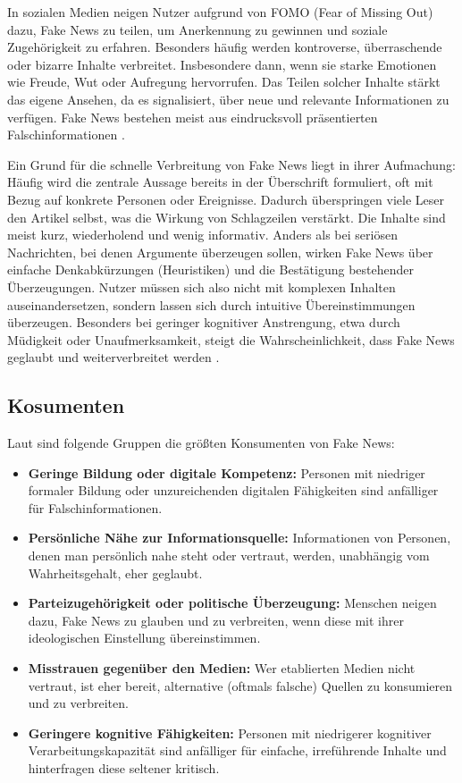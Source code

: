 In sozialen Medien neigen Nutzer aufgrund von FOMO (Fear of Missing Out) dazu, Fake News zu teilen, um Anerkennung zu gewinnen und soziale Zugehörigkeit zu erfahren. 
Besonders häufig werden kontroverse, überraschende oder bizarre Inhalte verbreitet. Insbesondere dann, wenn sie starke Emotionen wie Freude, Wut oder Aufregung hervorrufen. 
Das Teilen solcher Inhalte stärkt das eigene Ansehen, da es signalisiert, über neue und relevante Informationen zu verfügen. 
Fake News bestehen meist aus eindrucksvoll präsentierten Falschinformationen \cite{socsci9100185}.

Ein Grund für die schnelle Verbreitung von Fake News liegt in ihrer Aufmachung: Häufig wird die zentrale Aussage bereits in der Überschrift formuliert, 
oft mit Bezug auf konkrete Personen oder Ereignisse. Dadurch überspringen viele Leser den Artikel selbst, was die Wirkung von Schlagzeilen verstärkt. 
Die Inhalte sind meist kurz, wiederholend und wenig informativ. Anders als bei seriösen Nachrichten, bei denen Argumente überzeugen sollen, wirken Fake News über einfache Denkabkürzungen (Heuristiken) und die Bestätigung bestehender Überzeugungen. 
Nutzer müssen sich also nicht mit komplexen Inhalten auseinandersetzen, sondern lassen sich durch intuitive Übereinstimmungen überzeugen. 
Besonders bei geringer kognitiver Anstrengung, etwa durch Müdigkeit oder Unaufmerksamkeit, steigt die Wahrscheinlichkeit, dass Fake News geglaubt und weiterverbreitet werden \cite{horne2017}.

\subsection{Kosumenten}

Laut \cite{horne2017} sind folgende Gruppen die größten Konsumenten von Fake News:

\begin{itemize}
    \item \textbf{Geringe Bildung oder digitale Kompetenz:} Personen mit niedriger formaler Bildung oder unzureichenden digitalen Fähigkeiten sind anfälliger für Falschinformationen.
    
    \item \textbf{Persönliche Nähe zur Informationsquelle:} Informationen von Personen, denen man persönlich nahe steht oder vertraut, werden, unabhängig vom Wahrheitsgehalt, eher geglaubt.
    
    \item \textbf{Parteizugehörigkeit oder politische Überzeugung:} Menschen neigen dazu, Fake News zu glauben und zu verbreiten, wenn diese mit ihrer ideologischen Einstellung übereinstimmen.
    
    \item \textbf{Misstrauen gegenüber den Medien:} Wer etablierten Medien nicht vertraut, ist eher bereit, alternative (oftmals falsche) Quellen zu konsumieren und zu verbreiten.
    
    \item \textbf{Geringere kognitive Fähigkeiten:} Personen mit niedrigerer kognitiver Verarbeitungskapazität sind anfälliger für einfache, irreführende Inhalte und hinterfragen diese seltener kritisch.
\end{itemize}

